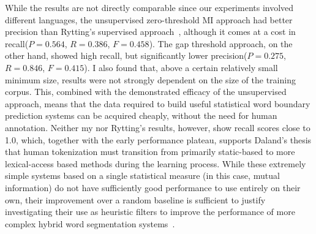 While the results are not directly comparable since our experiments involved different languages, the unsupervised zero-threshold MI approach had better precision than Rytting's supervised approach~\cite{rytting04}, although it comes at a cost in recall\textemdash($P = 0.564$, $R = 0.386$, $F = 0.458$). The gap threshold approach, on the other hand, showed high recall, but significantly lower precision\textemdash($P = 0.275$, $R = 0.846$, $F = 0.415$). I also found that, above a certain relatively small minimum size, results were not strongly dependent on the size of the training corpus. This, combined with the demonstrated efficacy of the unsupervised approach, means that the data required to build useful statistical word boundary prediction systems can be acquired cheaply, without the need for human annotation. Neither my nor Rytting's results, however, show recall scores close to 1.0, which, together with the early performance plateau, supports Daland's thesis that human tokenization must transition from primarily static-based to more lexical-access based methods during the learning process. While these extremely simple systems based on a single statistical measure (in this case, mutual information) do not have sufficiently good performance to use entirely on their own, their improvement over a random baseline is sufficient to justify investigating their use as heuristic filters to improve the performance of more complex hybrid word segmentation systems~\cite{kearsley14}.

